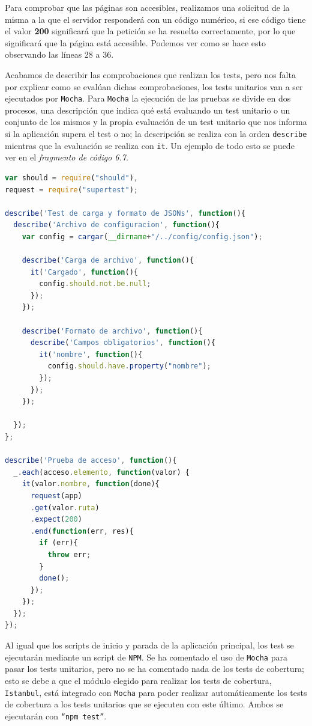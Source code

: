 Para comprobar que las páginas son accesibles, realizamos una solicitud de la misma a la que el servidor responderá con un código numérico, si ese código tiene el valor \textbf{200} significará que la petición se ha resuelto correctamente, por lo que significará que la página está accesible. Podemos ver como se hace esto observando las líneas 28 a 36.

\bigskip

Acabamos de describir las comprobaciones que realizan los tests, pero nos falta por explicar como se evalúan dichas comprobaciones, los tests unitarios van a ser ejecutados por {\tt Mocha}. Para {\tt Mocha} la ejecución de las pruebas se divide en dos procesos, una descripción que indica qué está evaluando un test unitario o un conjunto de los mismos y la propia evaluación de un test unitario que nos informa si la aplicación supera el test o no; la descripción se realiza con la orden {\tt describe} mientras que la evaluación se realiza con {\tt it}. Un ejemplo de todo esto se puede ver en el \textit{fragmento de código 6.7}.

\newpage
\begin{lstlisting}[language=javascript,caption={Archivo test.js},label={lst:testjs}]
var should = require("should"),
request = require("supertest");

describe('Test de carga y formato de JSONs', function(){
  describe('Archivo de configuracion', function(){
    var config = cargar(__dirname+"/../config/config.json");

    describe('Carga de archivo', function(){
      it('Cargado', function(){
        config.should.not.be.null;
      });
    });

    describe('Formato de archivo', function(){
      describe('Campos obligatorios', function(){
        it('nombre', function(){
          config.should.have.property("nombre");
        });
      });
    });
    
  });
};

describe('Prueba de acceso', function(){
  _.each(acceso.elemento, function(valor) {
    it(valor.nombre, function(done){
      request(app)
      .get(valor.ruta)
      .expect(200)
      .end(function(err, res){
        if (err){
          throw err;
        }
        done();
      });
    });
  });
});
\end{lstlisting}

Al igual que los scripts de inicio y parada de la aplicación principal, los test se ejecutarán mediante un script de {\tt NPM}. Se ha comentado el uso de {\tt Mocha} para pasar los tests unitarios, pero no se ha comentado nada de los tests de cobertura; esto se debe a que el módulo elegido para realizar los tests de cobertura, {\tt Istanbul}, está integrado con {\tt Mocha} para poder realizar automáticamente los tests de cobertura a los tests unitarios que se ejecuten con este último. Ambos se ejecutarán con {\tt ``npm test''}.

